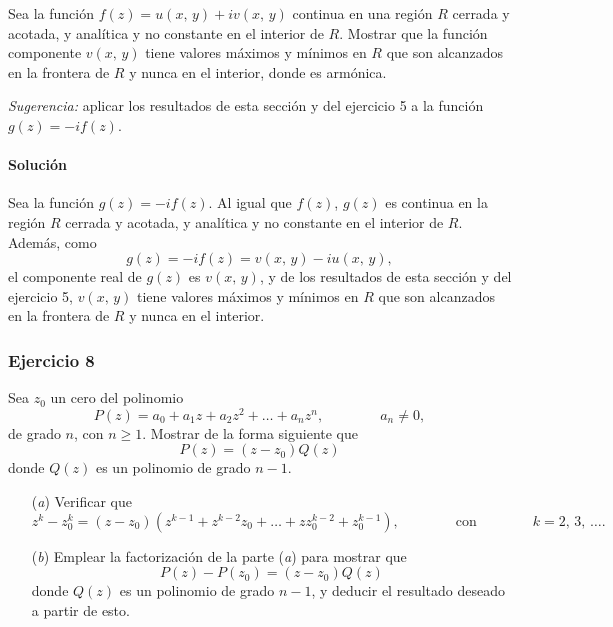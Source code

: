 \documentclass[a4paper]{report}
\begin{document}
Sea la función \(f(z)=u(x,\,y)+iv(x,\,y)\) continua en una región \(R\) cerrada y acotada, y analítica y no constante en el interior de \(R\). Mostrar que la función componente \(v(x,\,y)\) tiene valores máximos y mínimos en \(R\) que son alcanzados en la frontera de \(R\) y nunca en el interior, donde es armónica.

\emph{Sugerencia:} aplicar los resultados de esta sección y del ejercicio 5 a la función \(g(z)=-if(z)\). 

\paragraph{Solución} Sea la función \(g(z)=-if(z)\). Al igual que \(f(z)\), \(g(z)\) es continua en la región \(R\) cerrada y acotada, y analítica y no constante en el interior de \(R\). Además, como
\[
 g(z)=-if(z)=v(x,\,y)-iu(x,\,y),
\]
el componente real de \(g(z)\) es \(v(x,\,y)\), y de los resultados de esta sección y del ejercicio 5, \(v(x,\,y)\) tiene valores máximos y mínimos en \(R\) que son alcanzados en la frontera de \(R\) y nunca en el interior.

\subsubsection{Ejercicio 8}

Sea \(z_0\) un cero del polinomio
\[
 P(z)=a_0+a_1z+a_2z^2+\dots+a_nz^n,
 \qquad\qquad
 a_n\neq0,
\]
de grado \(n\), con \(n\geq1\). Mostrar de la forma siguiente que 
\[
 P(z)=(z-z_0)Q(z)
\]
donde \(Q(z)\) es un polinomio de grado \(n-1\).
\begin{enumerate}
 \item[(\textit{a})] Verificar que 
 \[
  z^k-z_0^k=(z-z_0)(z^{k-1}+z^{k-2}z_0+\dots+zz_0^{k-2}+z_0^{k-1}),
  \qquad\qquad\textrm{con}\qquad\qquad
  k=2,\,3,\,\dots.
 \]
 \item[(\textit{b})] Emplear la factorización de la parte (\textit{a}) para mostrar que 
 \[
  P(z)-P(z_0)=(z-z_0)Q(z)
 \]
 donde \(Q(z)\) es un polinomio de grado \(n-1\), y deducir el resultado deseado a partir de esto.
\end{enumerate}
\end{document}
